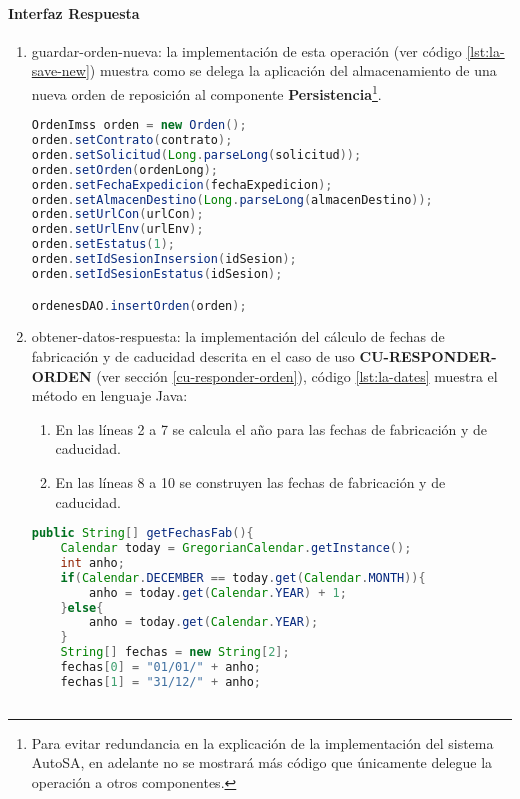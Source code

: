 \paragraph{\indent Interfaz Respuesta}
\begin{enumerate}
	\item guardar-orden-nueva: la implementación de esta operación (ver código \ref{lst:la-save-new}) muestra como se delega la aplicación del almacenamiento de una nueva orden de reposición al componente \textbf{Persistencia}\footnote{Para evitar redundancia en la explicación de la implementación del sistema AutoSA, en adelante no se mostrará más código que únicamente delegue la operación a otros componentes.}.
	\begin{lstlisting}[language=Java, caption={Delegación del almacenamiento de una nueva orden de reposición.}, label={lst:la-save-new}]
OrdenImss orden = new Orden();
orden.setContrato(contrato);
orden.setSolicitud(Long.parseLong(solicitud));
orden.setOrden(ordenLong);
orden.setFechaExpedicion(fechaExpedicion);
orden.setAlmacenDestino(Long.parseLong(almacenDestino));
orden.setUrlCon(urlCon);
orden.setUrlEnv(urlEnv);
orden.setEstatus(1);
orden.setIdSesionInsersion(idSesion);
orden.setIdSesionEstatus(idSesion);

ordenesDAO.insertOrden(orden);
	\end{lstlisting}

	\item obtener-datos-respuesta: la implementación del cálculo de fechas de fabricación y de caducidad descrita en el caso de uso \textbf{CU-RESPONDER-ORDEN} (ver sección \ref{cu-responder-orden}), código \ref{lst:la-dates} muestra el método en lenguaje Java:
	\begin{enumerate}
		\item En las líneas 2 a 7 se calcula el año para las fechas de fabricación y de caducidad.
		\item En las líneas 8 a 10 se construyen las fechas de fabricación y de caducidad.
	\end{enumerate}
	\begin{lstlisting}[language=Java, caption={Método para calcular las fechas de fabricación y caducidad.}, label={lst:la-dates}]
public String[] getFechasFab(){
	Calendar today = GregorianCalendar.getInstance();
	int anho;
	if(Calendar.DECEMBER == today.get(Calendar.MONTH)){
		anho = today.get(Calendar.YEAR) + 1;
	}else{
		anho = today.get(Calendar.YEAR);
	}
	String[] fechas = new String[2];
	fechas[0] = "01/01/" + anho;
	fechas[1] = "31/12/" + anho;
	

\end{lstlisting}
\end{enumerate}
